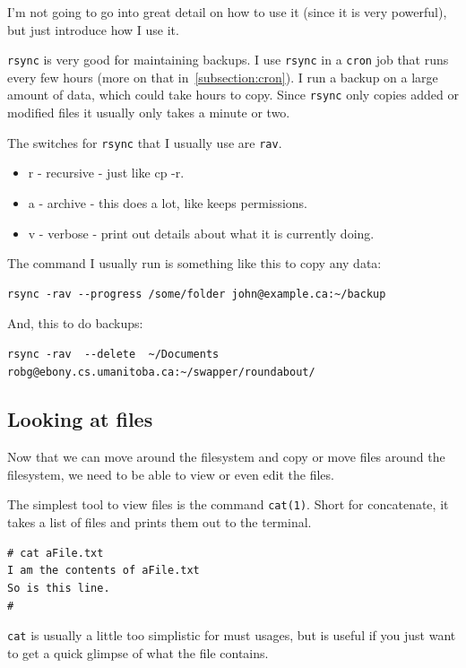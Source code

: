 I'm not going to go into great detail on how to use it (since it is very powerful), but 
just introduce how I use it.

{\tt rsync} is very good for maintaining backups.  I use {\tt rsync} in a 
{\tt cron} job that runs every few hours (more on that in~\ref{subsection:cron}).
I run a backup on a large amount of data, which could take hours to copy. 
Since {\tt rsync} only copies added or modified files it usually only 
takes a minute or two.

The switches for {\tt rsync} that I usually use are {\tt rav}. 
\begin{itemize}
\item r - recursive - just like cp -r.
\item a - archive - this does a lot, like keeps permissions.
\item v - verbose - print out details about what it is currently doing.
\end{itemize}

The command I usually run is something like this to copy any data:

{\tt \begin{verbatim}
rsync -rav --progress /some/folder john@example.ca:~/backup
\end{verbatim}
}

And, this to do backups:
{\tt \begin{verbatim}
rsync -rav  --delete  ~/Documents robg@ebony.cs.umanitoba.ca:~/swapper/roundabout/
\end{verbatim}
}



\subsection{Looking at files}
Now that we can move around the filesystem and copy or move
files around the filesystem, we need to be able to view
or even edit the files.

The simplest tool to view files is the command {\tt cat(1)}.
Short for concatenate, it takes a list of files and prints them out to
the terminal.

{\tt \begin{verbatim}
# cat aFile.txt
I am the contents of aFile.txt
So is this line.
#
\end{verbatim}
}

{\tt cat} is usually a little too simplistic for must usages,
but is useful if you just want to get a quick glimpse of what 
the file contains.

